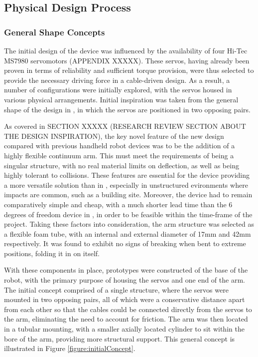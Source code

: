 \documentclass[11pt]{article}
\begin{document}
\subsection{Physical Design Process}
\subsubsection{General Shape Concepts}
The initial design of the device was influenced by the availability of four Hi-Tec MS7980 servomotors (APPENDIX XXXXX). These servos, having already been proven in terms of reliability and sufficient torque provision, were thus selected to provide the necessary driving force in a cable-driven design. As a result, a number of configurations were initially explored, with the servos housed in various physical arrangements. Initial inspiration was taken from the general shape of the design in \cite{GreggSmithDesign}, in which the servos are positioned in two opposing pairs.

As covered in SECTION XXXXX (RESEARCH REVIEW SECTION ABOUT THE DESIGN INSPIRATION), the key novel feature of the new design compared with previous handheld robot devices was to be the addition of a highly flexible continuum arm. This must meet the requirements of being a singular structure, with no real material limits on deflection, as well as being highly tolerant to collisions. These features are essential for the device providing a more versatile solution than in \cite{GreggSmithDesign}, especially in unstructured evironments where impacts are common, such as a building site. Moreover, the device had to remain comparatively simple and cheap, with a much shorter lead time than the 6 degrees of freedom device in \cite{GreggSmithKinematics}, in order to be feasible within the time-frame of the project. Taking these factors into consideration, the arm structure was selected as a flexible foam tube, with an internal and external diameter of 17mm and 42mm respectively. It was found to exhibit no signs of breaking when bent to extreme positions, folding it in on itself.

With these components in place, prototypes were constructed of the base of the robot, with the primary purpose of housing the servos and one end of the arm. The initial concept comprised of a single structure, where the servos were mounted in two opposing pairs, all of which were a conservative distance apart from each other so that the cables could be connected directly from the servos to the arm, eliminating the need to account for friction. The arm was then located in a tubular mounting, with a smaller axially located cylinder to sit within the bore of the arm, providing more structural support. This general concept is illustrated in Figure \ref{figure:initialConcept}.
\end{document}
